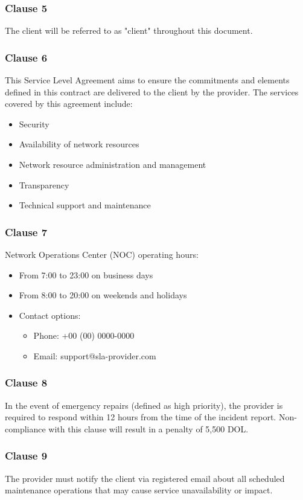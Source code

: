 \subsubsection*{Clause 5}
The client will be referred to as "client" throughout this document.

\subsubsection*{Clause 6}
This Service Level Agreement aims to ensure the commitments and elements defined in this contract are delivered to the client by the provider. The services covered by this agreement include:
\begin{itemize}
  \item Security
  \item Availability of network resources
  \item Network resource administration and management
  \item Transparency
  \item Technical support and maintenance
\end{itemize}

\subsubsection*{Clause 7}
Network Operations Center (NOC) operating hours:
\begin{itemize}
  \item From 7:00 to 23:00 on business days
  \item From 8:00 to 20:00 on weekends and holidays
  \item Contact options:
  \begin{itemize}
    \item Phone: +00 (00) 0000-0000
    \item Email: support@sla-provider.com
  \end{itemize}
\end{itemize}

\subsubsection*{Clause 8}
In the event of emergency repairs (defined as high priority), the provider is required to respond within 12 hours from the time of the incident report. Non-compliance with this clause will result in a penalty of 5,500 DOL.

\subsubsection*{Clause 9}
The provider must notify the client via registered email about all scheduled maintenance operations that may cause service unavailability or impact.

